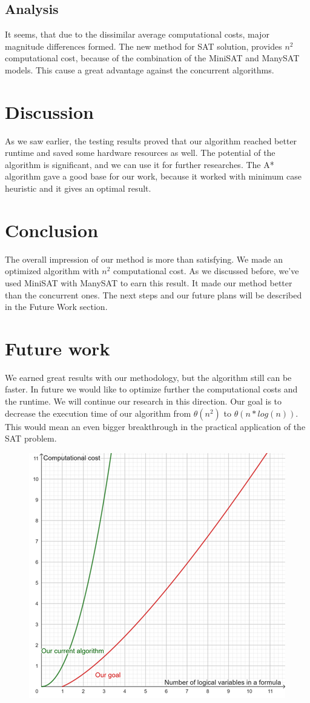 \documentclass{article}
\begin{document}
\subsection{Analysis}
It seems, that due to the dissimilar average computational costs, major magnitude differences formed. The new method for SAT solution, provides $n^{2}$ computational cost, because of the combination of the MiniSAT and ManySAT models. This cause a great advantage against the concurrent algorithms.

\section{Discussion}
\label{sec:discussion}

As we saw earlier, the testing results proved that our algorithm reached better runtime and saved some hardware resources as well. The potential of the algorithm is significant, and we can use it for further researches. The A* algorithm gave a good base for our work, because it worked with minimum case heuristic and it gives an optimal result.

\section{Conclusion}
\label{sec:conclusion}

The overall impression of our method is more than satisfying. We made an optimized algorithm with $n^2$ computational cost. As we discussed before, we've used MiniSAT with ManySAT to earn this result. It made our method better than the concurrent ones. The next steps and our future plans will be described in the Future Work section.

\section{Future work}
\label{sec:future}

We earned great results with our methodology, but the algorithm still can be faster.
In future we would like to optimize further the computational costs and the runtime.
We will continue our research in this direction.
Our goal is to decrease the execution time of our algorithm from $\theta(n^2)$ to $\theta (n*log(n))$. This would mean an even bigger breakthrough in the practical application of the SAT problem. 
\begin{figure}[h]
    \centering
    \includegraphics[width=0.5\linewidth]{img/futurework.png}
\end{figure}
\end{document}
